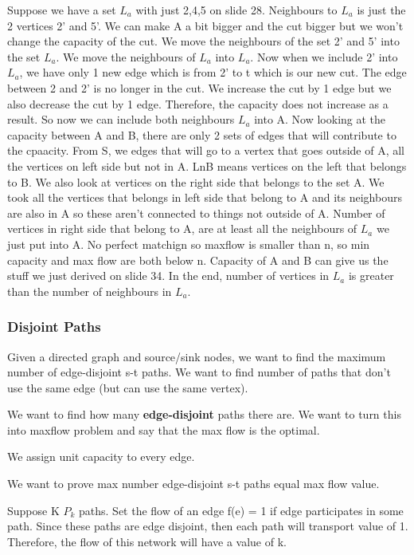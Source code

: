 \documentclass[11pt, oneside]{article}
\theoremstyle{definition}
\begin{document}
Suppose we have a set $L_a$ with just 2,4,5 on slide 28. Neighbours to $L_a$ is just the 2 vertices 2' and 5'. We can make A a bit bigger and the cut bigger but we won't change the capacity of the cut. We move the neighbours of the set 2' and 5' into the set $L_a$. We move the neighbours of $L_a$ into $L_a$. Now when we include 2' into $L_a$, we have only 1 new edge which is from 2' to t which is our new cut. The edge between 2 and 2' is no longer in the cut. We increase the cut by 1 edge but we also decrease the cut by 1 edge. Therefore, the capacity does not increase as a result. So now we can include both neighbours $L_a$ into A. Now looking at the capacity between A and B, there are only 2 sets of edges that will contribute to the cpaacity. From S, we edges that will go to a vertex that goes outside of A, all the vertices on left side but not in A. LnB means vertices on the left that belongs to B. We also look at vertices on the right side that belongs to the set A. We took all the vertices that belongs in left side that belong to A and its neighbours are also in A so these aren't connected to things not outside of A. Number of vertices in right side that belong to A, are at least all the neighbours of $L_a$ we just put into A. No perfect matchign so maxflow is smaller than n, so min capacity and max flow are both below n. Capacity of A and B can give us the stuff we just derived on slide 34. In the end, number of vertices in $L_a$ is greater than the number of neighbours in $L_a$.

\subsubsection{Disjoint Paths}
Given a directed graph and source/sink nodes, we want to find the maximum number of edge-disjoint s-t paths. We want to find number of paths that don't use the same edge (but can use the same vertex).

We want to find how many \textbf{edge-disjoint} paths there are. We want to turn this into maxflow problem and say that the max flow is the optimal.

We assign unit capacity to every edge.

We want to prove max number edge-disjoint s-t paths equal max flow value.

Suppose K $P_k$ paths. Set the flow of an edge f(e) = 1 if edge participates in some path. Since these paths are edge disjoint, then each path will transport value of 1. Therefore, the flow of this network will have a value of k.
\end{document}
